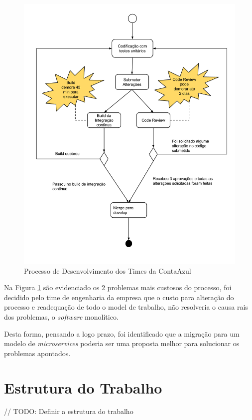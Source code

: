 \begin{figure}[hb]
	\begin{center}
		\includegraphics[width=12cm]{assets/processo_desenvolvimento.png}
		\caption{Processo de Desenvolvimento dos Times da ContaAzul}
		\label{fig:01}
	\end{center}
\end{figure}

Na Figura \ref{fig:01} são evidenciado os 2 problemas mais custosos do processo, foi decidido pelo time de engenharia da empresa que o custo para alteração do processo e readequação de todo o model de trabalho, não resolveria o causa rais dos problemas, o \textit{software} monolítico.

Desta forma, pensando a logo prazo, foi identificado que a migração para um modelo de \textit{microservices} poderia ser uma proposta melhor para solucionar os problemas apontados.

\section{Estrutura do Trabalho}

// TODO: Definir a estrutura do trabalho 